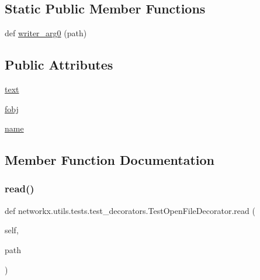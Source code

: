 \subsection*{Static Public Member Functions}
\begin{DoxyCompactItemize}
\item 
def \hyperlink{classnetworkx_1_1utils_1_1tests_1_1test__decorators_1_1TestOpenFileDecorator_afe7ac7dfc88220cdbdd624e676ccb5c5}{writer\+\_\+arg0} (path)
\end{DoxyCompactItemize}
\subsection*{Public Attributes}
\begin{DoxyCompactItemize}
\item 
\hyperlink{classnetworkx_1_1utils_1_1tests_1_1test__decorators_1_1TestOpenFileDecorator_aef35c3db51c739495dcebfd6558f2d36}{text}
\item 
\hyperlink{classnetworkx_1_1utils_1_1tests_1_1test__decorators_1_1TestOpenFileDecorator_a8b80483e8a031737e0e1527f4123d18a}{fobj}
\item 
\hyperlink{classnetworkx_1_1utils_1_1tests_1_1test__decorators_1_1TestOpenFileDecorator_abba02a1de5695f681ab4d7dca48bd273}{name}
\end{DoxyCompactItemize}


\subsection{Member Function Documentation}
\mbox{\label{classnetworkx_1_1utils_1_1tests_1_1test__decorators_1_1TestOpenFileDecorator_aba33356bb009b2d9f0f67cee71a86643}} 
\subsubsection{\texorpdfstring{read()}{read()}}
{\footnotesize\ttfamily def networkx.\+utils.\+tests.\+test\+\_\+decorators.\+Test\+Open\+File\+Decorator.\+read (\begin{DoxyParamCaption}\item[{}]{self,  }\item[{}]{path }\end{DoxyParamCaption})}

